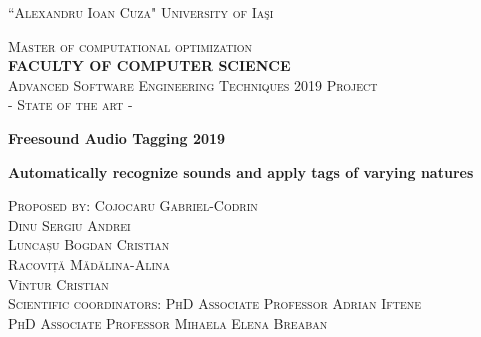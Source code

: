 \documentclass[11pt, a4papper]{report}
\theoremstyle{plain}
\theoremstyle{definition}
\theoremstyle{definition}
\theoremstyle{proposition}
\begin{document}
\begin{center}

\vspace*{.06\textheight}
{\scshape\large {``Alexandru Ioan Cuza" University of Iaşi}\par}\vspace{0.3cm} 
\textsc{\large {Master of computational optimization}}\\[0.3cm] 
\textbf{\textsc{\large {FACULTY OF COMPUTER SCIENCE }}}\\[1.3cm] 


\vspace{0.4cm}
\textsc{\large {Advanced Software Engineering Techniques 2019 Project}}\\[0.1cm]
\textsc{\large { - State of the art - }}\\[2.7cm]

\vspace{0.6cm}
{\LARGE \bfseries {Freesound Audio Tagging 2019}\par}
\vspace{0.2cm} 
{\Large \bfseries {Automatically recognize sounds and apply tags of varying natures}\par}


\vspace{4.4cm}

\begin{center}
\textsc{\large Proposed by: Cojocaru Gabriel-Codrin}\\
\textsc{\large Dinu Sergiu Andrei} \\
\textsc{\large Luncașu Bogdan Cristian} \\
\textsc{\large Racoviță Mădălina-Alina} \\
\textsc{\large Vîntur Cristian} \\
[3.1cm]
\textsc{\large Scientific coordinators}: {\textsc{\large PhD Associate Professor Adrian Iftene}} \\
{\textsc{\large PhD Associate Professor Mihaela Elena Breaban}}
\end{center}
\end{center}
\newpage



\tableofcontents

\newpage
\end{document}
